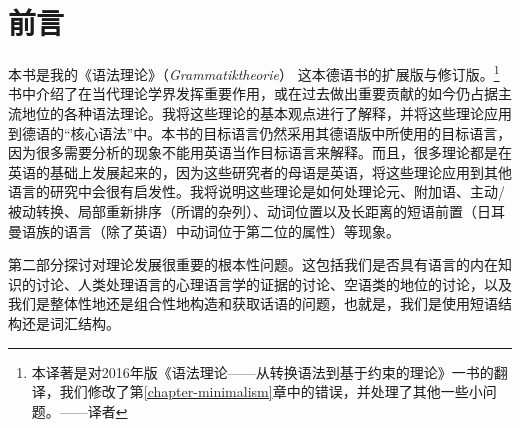 \chapter{前言}

本书是我的《语法理论》（\emph{Grammatiktheorie}） \citep{MuellerGTBuch2}这本德语书的扩展版与修订版。\footnote{
本译著是对2016年版《语法理论——从转换语法到基于约束的理论》一书的翻译，我们修改了第\ref{chapter-minimalism}章中的错误，并处理了其他一些小问题。——译者}
书中介绍了在当代理论学界发挥重要作用，或在过去做出重要贡献的如今仍占据主流地位的各种语法理论。我将这些理论的基本观点进行了解释，并将这些理论应用到德语的“核心语法”中。本书的目标语言仍然采用其德语版中所使用的目标语言，因为很多需要分析的现象不能用英语当作目标语言来解释。而且，很多理论都是在英语的基础上发展起来的，因为这些研究者的母语是英语，将这些理论应用到其他语言的研究中会很有启发性。我将说明这些理论是如何处理论元、附加语、主动/被动转换、局部重新排序（所谓的杂列）、动词位置以及长距离的短语前置（日耳曼语族的语言（除了英语）中动词位于第二位的属性）等现象。

第二部分探讨对理论发展很重要的根本性问题。这包括我们是否具有语言的内在知识的讨论、人类处理语言的心理语言学的证据的讨论、空语类的地位的讨论，以及我们是整体性地还是组合性地构造和获取话语的问题，也就是，我们是使用短语结构还是词汇结构。

